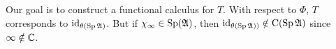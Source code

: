 Our goal is to construct a functional calculus for $T$. With respect to $\Phi$, $T$ corresponds to 
$\id_{\theta (\spe \A)}$. But if $\chi_\infty \in \spe (\A)$, then $\id_{\theta ( \spe \A ))}
\notin \cf (\spe \A)$ since $\infty \notin \C$.






% 
% 

 
















